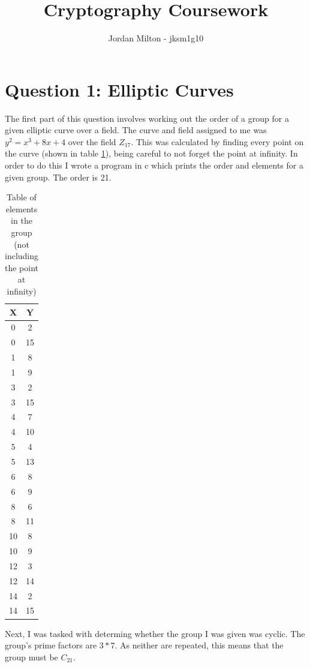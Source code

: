 \documentclass[12pt]{article}
\title{Cryptography Coursework}
\author{Jordan Milton - jksm1g10}
\begin{document}
\maketitle

\section{Question 1: Elliptic Curves}

The first part of this question involves working out the order of a group for a given elliptic curve over a field. The curve and field assigned to me was $y^2 = x^3 + 8x + 4$ over the field $Z_{17}$. This was calculated by finding every point on the curve (shown in table \ref{table:elems}), being careful to not forget the point at infinity. In order to do this I wrote a program in c which prints the order and elements for a given group. The order is 21.

\begin{table}[h!]
\label{table:elems}
\centering
\begin{tabular}{| c | c |}
 \hline
\textbf{X} & \textbf{Y} \\ \hline
0 & 2 \\ \hline
0 & 15 \\ \hline
1 & 8 \\ \hline
1 & 9 \\ \hline
3 & 2 \\ \hline
3 & 15 \\ \hline
4 & 7 \\ \hline
4 & 10 \\ \hline
5 & 4 \\ \hline
5 & 13 \\ \hline
6 & 8 \\ \hline
6 & 9 \\ \hline
8 & 6 \\ \hline
8 & 11 \\ \hline
10 & 8 \\ \hline
10 & 9 \\ \hline
12 & 3 \\ \hline
12 & 14 \\ \hline
14 & 2 \\ \hline
14 & 15 \\ \hline
\end{tabular}
\caption{Table of elements in the group (not including the point at infinity)}
\end{table}

Next, I was tasked with determing whether the group I was given was cyclic. The group's prime factors are $3 * 7$. As neither are repeated, this means that the group must be $C_{21}$.
\end{document}
